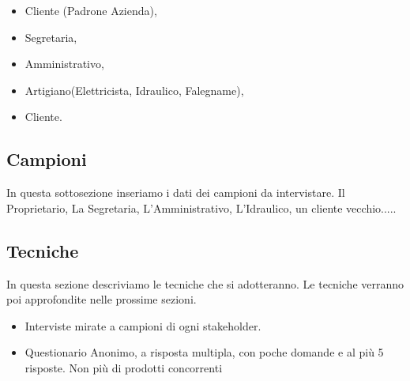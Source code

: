 \documentclass[11pt]{article}
\begin{document}
\begin{itemize}
\item Cliente (Padrone Azienda),
\item Segretaria,
\item Amministrativo,
\item Artigiano(Elettricista, Idraulico, Falegname),
\item Cliente.
\end{itemize}

\subsection{Campioni}
In questa sottosezione inseriamo i dati dei campioni da intervistare.
Il Proprietario, La Segretaria, L'Amministrativo,
 L'Idraulico, un cliente vecchio.....

 \subsection{Tecniche}
In questa sezione descriviamo le tecniche che si adotteranno. Le
tecniche verranno poi approfondite nelle prossime sezioni.
\begin{itemize}
\item Interviste mirate a campioni di ogni stakeholder.
\item Questionario Anonimo, a risposta multipla, con poche domande e
  al pi\`u 5 risposte. Non pi\`u di  prodotti concorrenti
\end{itemize}  
\end{document}
